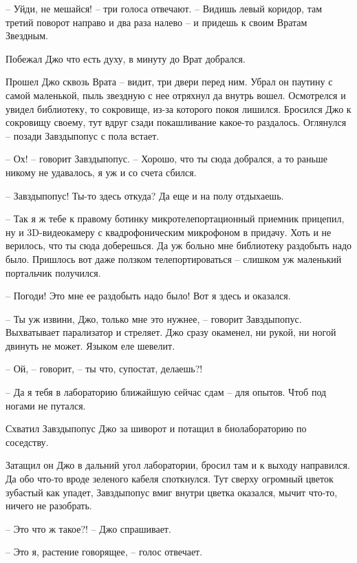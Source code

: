 \documentclass[ebook,oneside,final,openright]{memoir}
\begin{document}
– Уйди, не мешайся! – три голоса отвечают. – Видишь левый коридор, там третий поворот направо и два раза налево – и придешь к своим Вратам Звездным.\par
\par
Побежал Джо что есть духу, в минуту до Врат добрался.\par
\par
Прошел Джо сквозь Врата – видит, три двери перед ним. Убрал он паутину с самой маленькой, пыль звездную с нее отряхнул да внутрь вошел. Осмотрелся и увидел библиотеку, то сокровище, из-за которого покоя лишился. Бросился Джо к сокровищу своему, тут вдруг сзади покашливание какое-то раздалось. Оглянулся – позади Завздыпопус с пола встает.\par
– Ох! – говорит Завздыпопус. – Хорошо, что ты сюда добрался, а то раньше никому не удавалось, я уж и со счета сбился.\par
– Завздыпопус! Ты-то здесь откуда? Да еще и на полу отдыхаешь.\par
– Так я ж тебе к правому ботинку микротелепортационный приемник прицепил, ну и 3D-видеокамеру с квадрофоническим микрофоном в придачу. Хоть и не верилось, что ты сюда доберешься. Да уж больно мне библиотеку раздобыть надо было. Пришлось вот даже ползком телепортироваться – слишком уж маленький портальчик получился.\par
– Погоди! Это мне ее раздобыть надо было! Вот я здесь и оказался.\par
– Ты уж извини, Джо, только мне это нужнее, – говорит Завздыпопус. Выхватывает парализатор и стреляет. Джо сразу окаменел, ни рукой, ни ногой двинуть не может. Языком еле шевелит.\par
– Ой, – говорит, – ты что, супостат, делаешь?!\par
– Да я тебя в лабораторию ближайшую сейчас сдам – для опытов. Чтоб под ногами не путался.\par
Схватил Завздыпопус Джо за шиворот и потащил в биолабораторию по соседству.\par
\par
Затащил он Джо в дальний угол лаборатории, бросил там и к выходу направился. Да обо что-то вроде зеленого кабеля споткнулся. Тут сверху огромный цветок зубастый как упадет, Завздыпопус вмиг внутри цветка оказался, мычит что-то, ничего не разобрать.\par
\par
– Это что ж такое?! – Джо спрашивает.\par
– Это я, растение говорящее, – голос отвечает.\par
\end{document}
